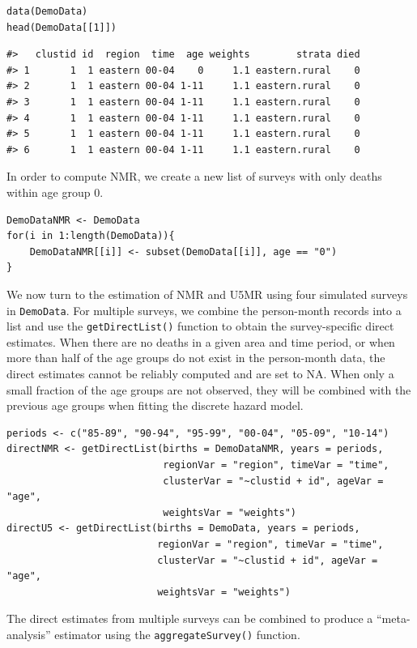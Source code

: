\begin{verbatim}
data(DemoData)
head(DemoData[[1]])
\end{verbatim}

\begin{verbatim}
#>   clustid id  region  time  age weights        strata died
#> 1       1  1 eastern 00-04    0     1.1 eastern.rural    0
#> 2       1  1 eastern 00-04 1-11     1.1 eastern.rural    0
#> 3       1  1 eastern 00-04 1-11     1.1 eastern.rural    0
#> 4       1  1 eastern 00-04 1-11     1.1 eastern.rural    0
#> 5       1  1 eastern 00-04 1-11     1.1 eastern.rural    0
#> 6       1  1 eastern 00-04 1-11     1.1 eastern.rural    0
\end{verbatim}

In order to compute NMR, we create a new list of surveys with only deaths within age group \(0\).

\begin{verbatim}
DemoDataNMR <- DemoData
for(i in 1:length(DemoData)){
    DemoDataNMR[[i]] <- subset(DemoData[[i]], age == "0")
}
\end{verbatim}

We now turn to the estimation of NMR and U5MR using four simulated surveys in \texttt{DemoData}. For multiple surveys, we combine the person-month records into a list and use the \texttt{getDirectList()} function to obtain the survey-specific direct estimates. When there are no deaths in a given area and time period, or when more than half of the age groups do not exist in the person-month data, the direct estimates cannot be reliably computed and are set to NA. When only a small fraction of the age groups are not observed, they will be combined with the previous age groups when fitting the discrete hazard model.

\begin{verbatim}
periods <- c("85-89", "90-94", "95-99", "00-04", "05-09", "10-14")
directNMR <- getDirectList(births = DemoDataNMR, years = periods, 
                           regionVar = "region", timeVar = "time", 
                           clusterVar = "~clustid + id", ageVar = "age", 
                           weightsVar = "weights")
directU5 <- getDirectList(births = DemoData, years = periods, 
                          regionVar = "region", timeVar = "time", 
                          clusterVar = "~clustid + id", ageVar = "age", 
                          weightsVar = "weights")
\end{verbatim}

The direct estimates from multiple surveys can be combined to produce a ``meta-analysis'' estimator using the \texttt{aggregateSurvey()} function.


